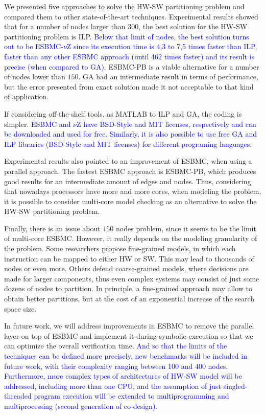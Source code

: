 \documentclass{doublecol-new}
\theoremstyle{TH}{
\newtheorem{lemma}{Lemma}
\newtheorem{theorem}[lemma]{Theorem}
\newtheorem{corrolary}[lemma]{Corrolary}
\newtheorem{conjecture}[lemma]{Conjecture}
\newtheorem{proposition}[lemma]{Proposition}
\newtheorem{claim}[lemma]{Claim}
\newtheorem{stheorem}[lemma]{Wrong Theorem}
\newtheorem{algorithm}{Algorithm}
}
\theoremstyle{THrm}{
\newtheorem{definition}{Definition}[section]
\newtheorem{question}{Question}[section]
\newtheorem{remark}{Remark}
\newtheorem{scheme}{Scheme}
}
\theoremstyle{THhit}{
\newtheorem{case}{Case}[section]
}
\begin{document}
We presented five approaches to solve the HW-SW partitioning problem and compared them to other state-of-the-art techniques. Experimental results showed that for a number of nodes larger than $300$, the best solution for the HW-SW partitioning problem is ILP. \textcolor{blue}{Below that limit of nodes, the best solution turns out to be ESBMC-$\nu$Z since its execution time is 4,3 to 7,5 times faster than ILP, faster than any other ESBMC approach (until 462 times faster) and its result is precise (when compared to GA).} ESBMC-PB is a viable alternative for a number of nodes lower than $150$. GA had an intermediate result in terms of performance, but the error presented from exact solution made it not acceptable to that kind of application. 

If considering off-the-shelf tools, as MATLAB to ILP and GA, the coding is simpler. \textcolor{blue}{ESBMC and $\nu$Z have BSD-Style and MIT licenses, respectively and can be downloaded and used for free. Similarly, it is also possible to use free GA and ILP libraries (BSD-Style and MIT licenses) for different programing languages.} 

Experimental results also pointed to an improvement of ESBMC, when using a parallel approach. The fastest ESBMC approach is ESBMC-PB, which produces good results for an intermediate amount of edges and nodes. Thus, considering that nowadays processors have more and more cores, when modeling the problem, it is possible to consider multi-core model checking as an alternative to solve the HW-SW partitioning problem. 

Finally, there is an issue about $150$ nodes problem, since it seems to be the limit of multi-core ESBMC. However, it really depends on the modeling granularity of the problem. Some researchers propose fine-grained models, in which each instruction can be mapped to either HW or SW. This may lead to thousands of nodes or even more. Others defend coarse-grained models, where decisions are made for larger components, thus even complex systems may consist of just some dozens of nodes to partition. In principle, a fine-grained approach may allow to obtain better partitions, but at the cost of an exponential increase of the search space size. 

In future work, we will address improvements in ESBMC to remove the parallel layer on top of ESBMC and implement it during symbolic execution so that we can optimize the overall verification time. \textcolor{blue}{And so that the limits of the techniques can be defined more precisely, new benchmarks will be included in future work, with their complexity ranging between 100 and 400 nodes. Furthermore, more complex types of architectures of HW-SW model will be addressed, including more than one CPU, and the assumption of just singled-threaded program execution will be extended to multiprogramming and multiprocessing (second generation of co-design).}
\end{document}
